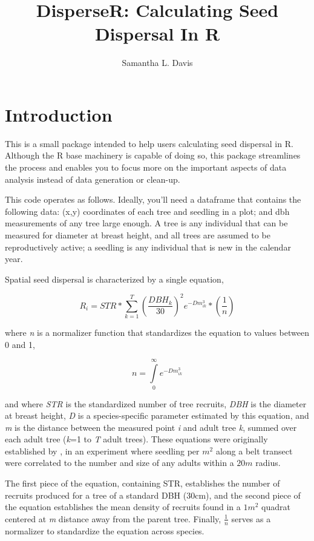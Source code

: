 \documentclass{article}
\title{DisperseR: Calculating Seed Dispersal In R}
\author{Samantha L. Davis}
\begin{document}
\maketitle


\section{Introduction}

This is a small package intended to help users calculating seed dispersal in R. Although the R base machinery is capable of doing so, this package streamlines the process and enables you to focus more on the important aspects of data analysis instead of data generation or clean-up.

This code operates as follows. Ideally, you'll need a dataframe that contains the following data: (x,y) coordinates of each tree and seedling in a plot; and dbh measurements of any tree large enough. A tree is any individual that can be measured for diameter at breast height, and all trees are assumed to be reproductively active; a seedling is any individual that is new in the calendar year.

Spatial seed dispersal is characterized by a single equation,

\begin{equation}
\label{eq:dispersal}
R_i = STR * \sum\limits_{k=1}^T\left( \frac{DBH_k}{30}\right) ^2 e^{-Dm_{ik}^3} * \left( \frac{1}{n}\right)
\end{equation}

where \textit{n} is a normalizer function that standardizes the equation to values between 0 and 1,

\begin{equation}
n = \int\limits_{0}^\infty e^{-Dm_{ik}^3} \nonumber
\end{equation}

and where \textit{STR} is the standardized number of tree recruits, \textit{DBH} is the diameter at breast height, \textit{D} is a species-specific parameter estimated by this equation, and \textit{m} is the distance between the measured point \textit{i} and adult tree \textit{k}, summed over each adult tree (\textit{k}=1 to \textit{T} adult trees). These equations were originally established by \citet{Ribbens1994}, in an experiment where seedling per $m^2$ along a belt transect were correlated to the number and size of any adults within a $20 m$ radius.

The first piece of the equation, containing STR, establishes the number of recruits produced for a tree of a standard DBH (30cm), and the second piece of the equation establishes the mean density of recruits found in a $1 m^2$ quadrat centered at \textit{m} distance away from the parent tree. Finally, $\frac{1}{n}$ serves as a normalizer to standardize the equation across species.
\end{document}
